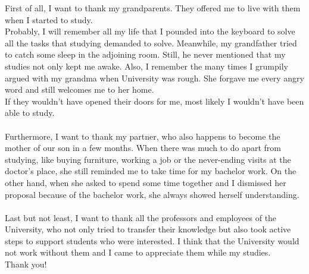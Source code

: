 \documentclass[draft,final]{vutinfth} %
\begin{document}
\begin{acknowledgements*}
First of all, I want to thank my grandparents. They offered me to live with them when I started to study.\\
Probably, I will remember all my life that I pounded into the keyboard to solve all the tasks that studying demanded to solve. Meanwhile, my grandfather tried to catch some sleep in the adjoining room. Still, he never mentioned that my studies not only kept me awake. Also, I remember the many times I grumpily argued with my grandma when University was rough. She forgave me every angry word and still welcomes me to her home.\\
If they wouldn't have opened their doors for me, most likely I wouldn't have been able to study.\\
\\
Furthermore, I want to thank my partner, who also happens to become the mother of our son in a few months. When there was much to do apart from studying, like buying furniture, working a job or the never-ending visits at the doctor's place, she still reminded me to take time for my bachelor work. On the other hand, when she asked to spend some time together and I dismissed her proposal because of the bachelor work, she always showed herself understanding.\\
\\
Last but not least, I want to thank all the professors and employees of the University, who not only tried to transfer their knowledge but also took active steps to support students who were interested. I think that the University would not work without them and I came to appreciate them while my studies.\\
Thank you!
\end{acknowledgements*}

\begin{kurzfassung}
\end{kurzfassung}

\begin{abstract}
\end{abstract}


\tableofcontents %

\mainmatter
\end{document}
